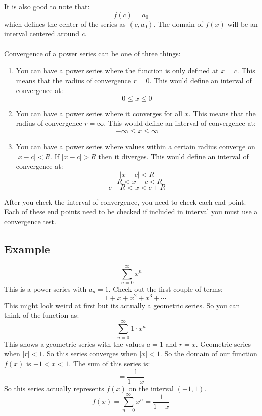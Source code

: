 \documentclass{report}
\begin{document}
    It is also good to note that:
    \[f(c) = a_0\]
    which defines the center of the series as \((c, a_0)\).
    The domain of \(f(x)\) will be an interval centered around \(c\).\\
    \\
    Convergence of a power series can be one of three things:
    \begin{enumerate}
        \item You can have a power series where the function is only defined at \(x = c\).
        This means that the radius of convergence \(r = 0\).
        This would define an interval of convergence at:
        \[0 \leq x \leq 0\]
        \item You can have a power series where it converges for all \(x\).
        This means that the radius of convergence \(r = \infty\).
        This would define an interval of convergence at:
        \[- \infty \leq x \leq \infty\]
        \item You can have a power series where values within a certain radius converge on
        \(|x-c| < R\).
        If \(|x-c| > R\) then it diverges.
        This would define an interval of convergence at:
        \[|x-c| < R\]
        \[-R < x - c < R\]
        \[c - R < x < c + R\]
    \end{enumerate}
    After you check the interval of convergence, you need to check each end point.
    Each of these end points need to be checked if included in interval you must use a convergence test.
    
    \subsection{Example}
        \[\sum_{n=0}^{\infty} x^n \]
        This is a power series with \(a_n = 1\).
        Check out the first couple of terms:
        \[= 1 + x + x^2 + x^3 + \cdots\]
        This might look weird at first but its actually a geometric series.
        So you can think of the function as:
        \[\sum_{n=0}^{\infty} 1 \cdot x^n\]
        This shows a geometric series with the values \(a = 1\) and \(r = x\).
        Geometric series when \(|r| < 1\).
        So this series converges when \(|x| < 1\).
        So the domain of our function \(f(x)\) is \(-1 < x < 1\).
        The sum of this series is:
        \[= \frac{1}{1-x}\]
        So this series actually represents \(f(x)\) on the interval \((-1, 1)\).
        \[f(x) = \sum_{n=0}^{\infty} x^n = \frac{1}{1-x}\] 
        
\end{document}
